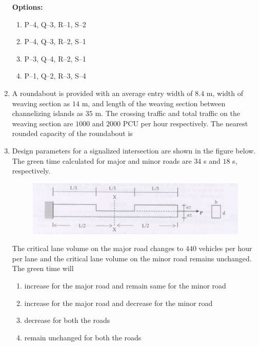 \documentclass[journal]{IEEEtran}
\begin{document}
\begin{enumerate}
\textbf{Options:}
\begin{enumerate}
    \item P--4, Q--3, R--1, S--2
    \item P--4, Q--3, R--2, S--1
    \item P--3, Q--4, R--2, S--1
    \item P--1, Q--2, R--3, S--4
\end{enumerate}

\item A roundabout is provided with an average entry width of $8.4$ m, width of weaving section as $14$ m, and length of the weaving section between channelizing islands as $35$ m. The crossing traffic and total traffic on the weaving section are $1000$ and $2000$ PCU per hour respectively. The nearest rounded capacity of the roundabout  is \hfill {}
\begin{enumerate}
\end{enumerate}

\item Design parameters for a signalized intersection are shown in the figure below. The green time calculated for major and minor roads are $34$ s and $18$ s, respectively. \hfill {}

\begin{figure}[H]
    \centering
    \includegraphics[width=0.6\columnwidth]{figs/fig2.png} 
    \caption{}
    \label{fig:placeholder}
\end{figure}

The critical lane volume on the major road changes to $440$ vehicles per hour per lane and the critical lane volume on the minor road remains unchanged. The green time will


\begin{enumerate}
\item increase for the major road and remain same for the minor road
\item increase for the major road and decrease for the minor road
\item decrease for both the roads
\item remain unchanged for both the roads
\end{enumerate}  



\end{enumerate}
\end{document}
